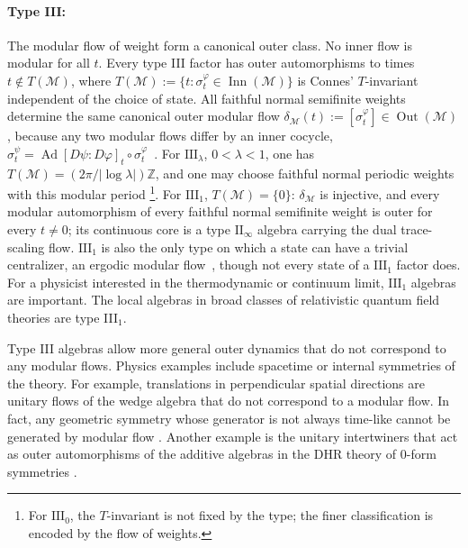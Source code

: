 \documentclass[a4paper,11pt]{article}
\theoremstyle{definition}
\newcommand{\mM}{\mathcal{M}}
\begin{document}
\paragraph{Type III:} The modular flow of weight form a canonical outer class.
No inner flow is modular for all $t$. Every type III factor has outer automorphisms to times $t\notin T(\mM)$, where $T(\mM):=\{t:\sigma^\varphi_t\in\operatorname{Inn}(\mM)\}$ is Connes' $T$-invariant independent of the choice of state. All faithful normal semifinite weights determine the same canonical outer modular flow $\delta_{\mM}(t):=[\sigma^\varphi_t]\in\operatorname{Out}(\mM)$, because any two modular flows differ by an inner cocycle, $\sigma^\psi_t=\operatorname{Ad}[D\psi:D\varphi]_t\circ\sigma^\varphi_t$~\cite{Connes1973,ConnesTakesaki1977}. For $\mathrm{III}_\lambda$, $0<\lambda<1$, one has $T(\mM)=(2\pi/|\log\lambda|)\mathbb Z$, and one may choose faithful normal periodic weights with this modular period \footnote{For $\mathrm{III}_0$, the $T$-invariant is not fixed by the type; the finer classification is encoded by the flow of weights.}. For $\mathrm{III}_1$, $T(\mM)=\{0\}$: $\delta_{\mM}$ is injective, and every modular automorphism of every faithful normal semifinite weight is outer for every $t\ne0$; its continuous core is a type $\mathrm{II}_\infty$ algebra carrying the dual trace-scaling flow. $\mathrm{III}_1$ is also the only type on which a state can have a trivial centralizer, an ergodic modular flow~\cite{Connes1973,Longo1982}, though not every state of a $\mathrm{III}_1$ factor does. For a physicist interested in the thermodynamic or continuum limit, $\mathrm{III}_1$ algebras are important. The local algebras in broad classes of relativistic quantum field theories are type III$_1$. 
    
    Type III algebras allow more general outer dynamics that do not correspond to any modular flows. Physics examples include spacetime or internal symmetries of the theory. For example, translations in perpendicular spatial directions are unitary flows of the wedge algebra that do not correspond to a modular flow. In fact, any geometric symmetry whose generator is not always time-like cannot be generated by modular flow \cite{BenyKempfKribs2007}. Another example is the unitary intertwiners that act as outer automorphisms of the additive algebras in the DHR theory of $0$-form symmetries \cite{casini2020entanglement}. 





\end{document}

